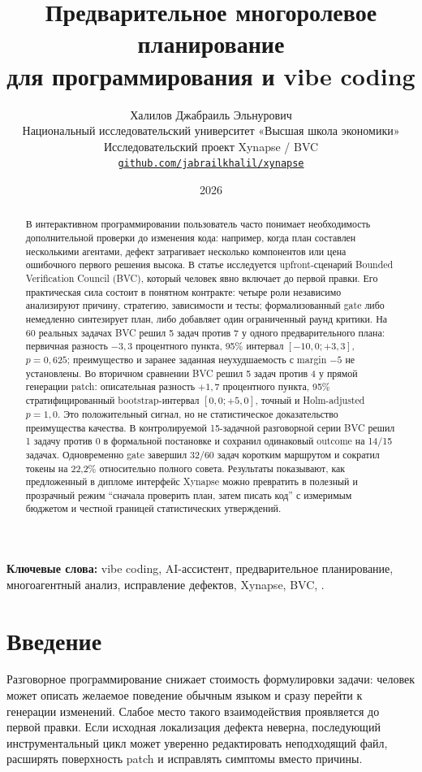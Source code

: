 \documentclass[11pt]{article}
\title{\vspace{-1.2em}\textbf{\sffamily Предварительное многоролевое планирование\\
для программирования и vibe coding}}
\author{Халилов Джабраиль Эльнурович\\
\small Национальный исследовательский университет «Высшая школа экономики»\\
\small Исследовательский проект Xynapse / BVC\\
\small \href{https://github.com/jabrailkhalil/xynapse}{\nolinkurl{github.com/jabrailkhalil/xynapse}}}
\date{2026}
\begin{document}
\maketitle

\begin{abstract}
В интерактивном программировании пользователь часто понимает необходимость
дополнительной проверки до изменения кода: например, когда план составлен
несколькими агентами, дефект затрагивает несколько компонентов или цена
ошибочного первого решения высока. В статье исследуется upfront-сценарий
Bounded Verification Council (BVC), который человек явно включает до первой
правки. Его практическая сила состоит в понятном контракте: четыре роли
независимо анализируют причину, стратегию, зависимости и тесты;
формализованный gate либо немедленно синтезирует план, либо добавляет один
ограниченный раунд критики. На 60 реальных задачах \dataset{} BVC решил
5 задач против 7 у одного предварительного плана: первичная разность
\(-3{,}3\) процентного пункта, 95\% интервал
\([-10{,}0;+3{,}3]\), \(p=0{,}625\); преимущество и заранее заданная
неухудшаемость с margin \(-5\) \pp{} не установлены. Во вторичном сравнении
BVC решил 5 задач против 4 у прямой генерации patch: описательная разность
\(+1{,}7\) процентного пункта, 95\% стратифицированный bootstrap-интервал
\([0{,}0;+5{,}0]\), точный и Holm-adjusted \(p=1{,}0\). Это положительный
сигнал, но не
статистическое доказательство преимущества качества. В контролируемой
15-задачной разговорной серии BVC решил 1 задачу против 0 в формальной
постановке и сохранил одинаковый outcome на 14/15 задачах. Одновременно gate
завершил 32/60 задач коротким маршрутом и сократил токены на 22,2\%
относительно полного совета. Результаты показывают, как предложенный в
дипломе интерфейс Xynapse можно превратить в полезный и прозрачный режим
\enquote{сначала проверить план, затем писать код} с измеримым бюджетом и
честной границей статистических утверждений.
\end{abstract}

\noindent\textbf{Ключевые слова:} vibe coding, AI-ассистент, предварительное
планирование, многоагентный анализ, исправление дефектов, Xynapse, BVC,
\dataset{}.

\section{Введение}

Разговорное программирование снижает стоимость формулировки задачи: человек
может описать желаемое поведение обычным языком и сразу перейти к генерации
изменений. Слабое место такого взаимодействия проявляется до первой правки.
Если исходная локализация дефекта неверна, последующий инструментальный цикл
может уверенно редактировать неподходящий файл, расширять поверхность patch и
исправлять симптомы вместо причины.
\end{document}
